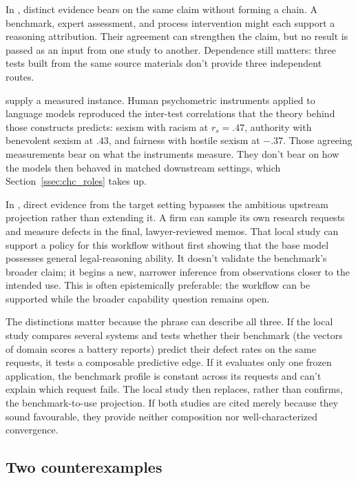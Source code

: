 \documentclass[12pt]{article}
\begin{document}
In , distinct evidence bears on the same claim without forming a chain. A benchmark, expert assessment, and process intervention might each support a reasoning attribution. Their agreement can strengthen the claim, but no result is passed as an input from one study to another. Dependence still matters: three tests built from the same source materials don't provide three independent routes.

\Textcite{jung2026psychometric} supply a measured instance. Human psychometric instruments applied to language models reproduced the inter-test correlations that the theory behind those constructs predicts: sexism with racism at \(r_s=.47\), authority with benevolent sexism at \(.43\), and fairness with hostile sexism at \(-.37\). Those agreeing measurements bear on what the instruments measure. They don't bear on how the models then behaved in matched downstream settings, which Section~\ref{ssec:chc_roles} takes up.

In , direct evidence from the target setting bypasses the ambitious upstream projection rather than extending it. A firm can sample its own research requests and measure defects in the final, lawyer-reviewed memos. That local study can support a policy for this workflow without first showing that the base model possesses general legal-reasoning ability. It doesn't validate the benchmark's broader claim; it begins a new, narrower inference from observations closer to the intended use. This is often epistemically preferable: the workflow can be supported while the broader capability question remains open.

The distinctions matter because the phrase  can describe all three. If the local study compares several systems and tests whether their benchmark  (the vectors of domain scores a battery reports) predict their defect rates on the same requests, it tests a composable predictive edge. If it evaluates only one frozen application, the benchmark profile is constant across its requests and can't explain which request fails. The local study then replaces, rather than confirms, the benchmark-to-use projection. If both studies are cited merely because they sound favourable, they provide neither composition nor well-characterized convergence.

\subsection{Two counterexamples}\label{ssec:counterexample}
\end{document}
